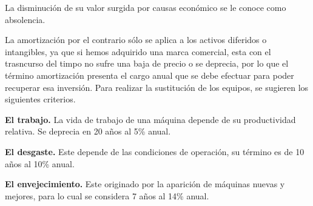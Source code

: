 La disminución de su valor surgida por causas económico se le conoce como absolencia.

La amortización por el contrario sólo se aplica a los activos diferidos o intangibles, ya que si hemos
adquirido una marca comercial, esta con el trasncurso del timpo no sufre una baja de precio o se deprecia,
por lo que el término amortización presenta el cargo anual que se debe efectuar para poder recuperar esa inversión.
Para realizar la sustitución de los equipos, se sugieren los siguientes criterios.

\textbf{El trabajo.} La vida de trabajo de una máquina depende de su productividad relativa. Se deprecia
en 20 años al 5\% anual.

\textbf{El desgaste.} Este depende de las condiciones de operación, su término es de 10 años al 10\% anual.

\textbf{El envejecimiento.} Este originado por la aparición de máquinas nuevas y mejores, para lo cual se
considera 7 años al 14\% anual.

